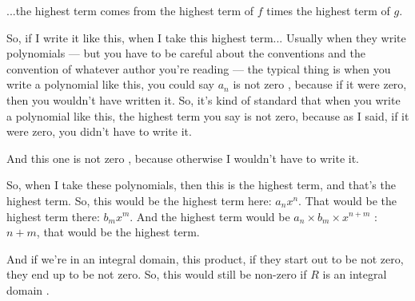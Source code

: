 \begin{speech}[00:22:05 - 00:23:22]
...the highest term comes from the highest term of $f$ times the highest term of $g$.

So, if I write it like this, when I take this highest term... Usually when they write polynomials --- but you have to be careful about the conventions and the convention of whatever author you're reading --- the typical thing is when you write a polynomial like this, you could say $a_n$ is not zero , because if it were zero, then you wouldn't have written it. So, it's kind of standard that when you write a polynomial like this, the highest term you say is not zero, because as I said, if it were zero, you didn't have to write it.

And this one  is not zero , because otherwise I wouldn't have to write it.

So, when I take these polynomials, then this is the highest term, and that's the highest term. So, this would be the highest term here: $a_n x^n$. That would be the highest term there: $b_m x^m$. And the highest term would be $a_n \times b_m \times x^{n+m}$ : $n + m$, that would be the highest term.

And if we're in an integral domain, this product, if they start out to be not zero, they end up to be not zero. So, this would still be non-zero if $R$ is an integral domain .
\end{speech}


